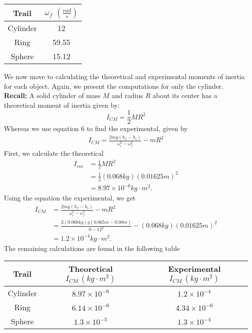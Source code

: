 \documentclass{report}
\begin{document}
    \bigbreak \noindent 
    \begin{center}
        \begin{tabular}{c|c}
             Trail & $\omega_{f}$  $\left(\frac{rad}{s}\right) $\\
            \hline
             Cylinder & 12\\
             Ring & 59.55\\
             Sphere & 15.12
        \end{tabular}
    \end{center}
    \bigbreak \noindent 
    We now move to calculating the theoretical and experimental moments of inertia for each object. Again, we present the computations for only the cylinder.
    \bigbreak \noindent 
    \textbf{Recall:}
    \bigbreak \noindent 
     A solid cylinder of mass $M$ and radius $R$ about its center has a theoretical moment of inertia given by:
    $$
    I_{C M}=\frac{1}{2} M R^2
    $$
    \bigbreak \noindent 
    Whereas we use equation 6 to find the experimental, given by
    $$
    \begin{gathered}
        I_{CM} = \frac{2 m g(h_f - h_i)}{\omega_i^2 - \omega_f^2} - m R^2
    \end{gathered}
    $$
    \bigbreak \noindent 
    First, we calculate the theoretical
    \begin{align*}
        I_{cm} &= \frac{1}{2}MR^{2} \\
        &=\frac{1}{2}(0.068kg)(0.01625m)^{2} \\
        &=8.97 \times 10^{-6}kg \cdot m^{2}
    .\end{align*}
    \bigbreak \noindent 
    Using the equation the experimental, we get
    \begin{align*}
        I_{CM} &= \frac{2 m g(h_f - h_i)}{\omega_i^2 - \omega_f^2} - m R^2 \\
               &=\frac{2(0.068kg)g(0.065m - 0.08m)}{0 - 12^{2}} - (0.068kg)(0.01625m)^{2} \\
               &=1.2 \times 10^{-4}kg \cdot m^{2}
    .\end{align*}
    \bigbreak \noindent 
    The remaining calculations are found in the following table
    \begin{center}
        \begin{tabular}{c|c|c}
            Trail & Theoretical $I_{CM}\, (kg \cdot m^{2})$ & Experimental $I_{CM}\, (kg \cdot m^{2})$ \\
            \hline
            Cylinder & $8.97 \times 10^{-6}$ & $1.2\times 10^{-4}$ \\
            Ring & $6.14 \times 10^{-6}$&  $4.34 \times 10^{-6} $\\
            Sphere  & $1.3 \times 10^{-5} $& $1.3 \times 10^{-4}$
        \end{tabular}
    \end{center}
\end{document}
